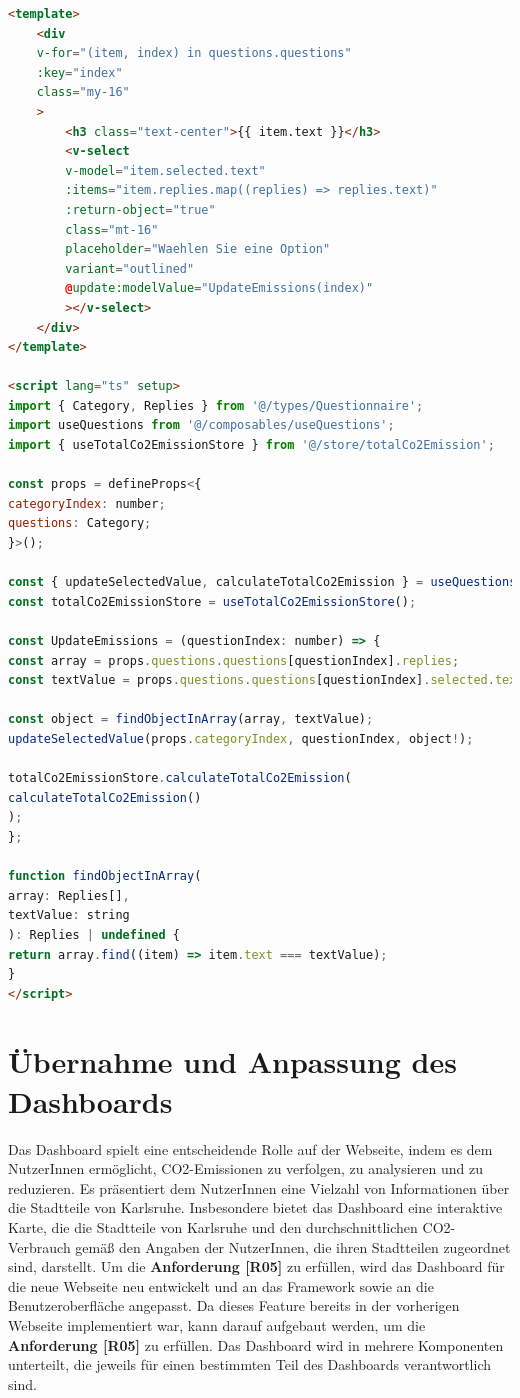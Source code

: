 \begin{lstlisting}[language={html}, caption={QuestionBlock.vue}]
<template>
    <div
    v-for="(item, index) in questions.questions"
    :key="index"
    class="my-16"
    >
        <h3 class="text-center">{{ item.text }}</h3>
        <v-select
        v-model="item.selected.text"
        :items="item.replies.map((replies) => replies.text)"
        :return-object="true"
        class="mt-16"
        placeholder="Waehlen Sie eine Option"
        variant="outlined"
        @update:modelValue="UpdateEmissions(index)"
        ></v-select>
    </div>
</template>

<script lang="ts" setup>
import { Category, Replies } from '@/types/Questionnaire';
import useQuestions from '@/composables/useQuestions';
import { useTotalCo2EmissionStore } from '@/store/totalCo2Emission';

const props = defineProps<{
categoryIndex: number;
questions: Category;
}>();

const { updateSelectedValue, calculateTotalCo2Emission } = useQuestions();
const totalCo2EmissionStore = useTotalCo2EmissionStore();

const UpdateEmissions = (questionIndex: number) => {
const array = props.questions.questions[questionIndex].replies;
const textValue = props.questions.questions[questionIndex].selected.text;

const object = findObjectInArray(array, textValue);
updateSelectedValue(props.categoryIndex, questionIndex, object!);

totalCo2EmissionStore.calculateTotalCo2Emission(
calculateTotalCo2Emission()
);
};

function findObjectInArray(
array: Replies[],
textValue: string
): Replies | undefined {
return array.find((item) => item.text === textValue);
}
</script>
\end{lstlisting}

\section{Übernahme und Anpassung des Dashboards}

Das Dashboard spielt eine entscheidende Rolle auf der Webseite, indem es dem NutzerInnen ermöglicht, CO2-Emissionen zu verfolgen, zu analysieren und zu reduzieren. Es präsentiert dem NutzerInnen eine Vielzahl von Informationen über die Stadtteile von Karlsruhe. Insbesondere bietet das Dashboard eine interaktive Karte, die die Stadtteile von Karlsruhe und den durchschnittlichen CO2-Verbrauch gemäß den Angaben der NutzerInnen, die ihren Stadtteilen zugeordnet sind, darstellt. Um die \textbf{Anforderung [R05]} zu erfüllen, wird das Dashboard für die neue Webseite neu entwickelt und an das Framework sowie an die Benutzeroberfläche angepasst. Da dieses Feature bereits in der vorherigen Webseite implementiert war, kann darauf aufgebaut werden, um die \textbf{Anforderung [R05]} zu erfüllen. Das Dashboard wird in mehrere Komponenten unterteilt, die jeweils für einen bestimmten Teil des Dashboards verantwortlich sind.

